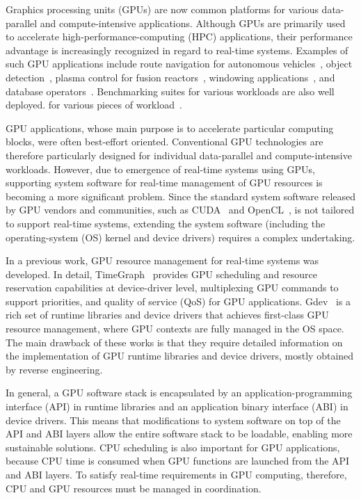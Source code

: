 Graphics processing units (GPUs) are now common platforms for various data-parallel and compute-intensive applications. Although GPUs are primarily used to accelerate high-performance-computing (HPC) applications, their performance advantage is increasingly recognized in regard to real-time systems. Examples of such GPU applications include route navigation for autonomous vehicles~\cite{cmu:routing}, object detection~\cite{hirabayashi:cpsna2013}, plasma control for fusion reactors~\cite{tokamak}, windowing applications~\cite{kato:rtas2011}, and database operators~\cite{bakkum:sql}. Benchmarking suites for various workloads are also well deployed. for various pieces of workload~\cite{rodinia}.

GPU applications, whose main purpose is to accelerate particular computing blocks, were often best-effort oriented. Conventional GPU technologies are therefore particularly designed for individual data-parallel and compute-intensive workloads. However, due to emergence of real-time systems using GPUs, supporting system software for real-time management of GPU resources is becoming a more significant problem. Since the standard system software released by GPU vendors and communities, such as CUDA~\cite{nvidia:cuda_zone} and OpenCL~\cite{opencl}, is not tailored to support real-time systems, extending the system software (including the operating-system (OS) kernel and device drivers) requires a complex undertaking.

In a previous work, GPU resource management for real-time systems was developed. In detail, TimeGraph~\cite{kato:timegraph} provides GPU scheduling and resource reservation capabilities at device-driver level, multiplexing GPU commands to support priorities, and quality of service (QoS) for GPU applications. Gdev~\cite{kato:gdev} is a rich set of runtime libraries and device drivers that achieves first-class GPU resource management, where GPU contexts are fully managed in the OS space. The main drawback of these works is that they require detailed information on the implementation of GPU runtime libraries and device drivers, mostly obtained by reverse engineering.

In general, a GPU software stack is encapsulated by an application-programming interface (API) in runtime libraries and an application binary interface (ABI) in device drivers. This means that modifications to system software on top of the API and ABI layers allow the entire software stack to be loadable, enabling more sustainable solutions. CPU scheduling is also important for GPU applications, because CPU time is consumed when GPU functions are launched from the API and ABI layers. To satisfy real-time requirements in GPU computing, therefore, CPU and GPU resources must be managed in coordination.

